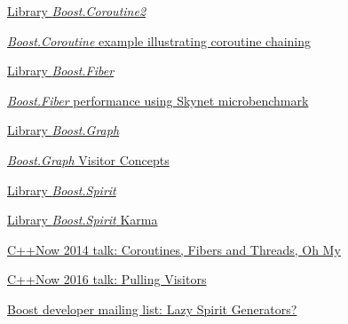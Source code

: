\begin{thebibliography}{99}
        \href{http://www.boost.org/doc/libs/release/libs/coroutine2/doc/html/index.html}
        {Library \emph{Boost.Coroutine2}}

        \href{https://github.com/boostorg/coroutine/blob/master/example/asymmetric/chaining.cpp}
        {\emph{Boost.Coroutine} example illustrating coroutine chaining}

        \href{http://www.boost.org/doc/libs/release/libs/fiber/doc/html/index.html}
        {Library \emph{Boost.Fiber}}

        \href{http://www.boost.org/doc/libs/release/libs/fiber/doc/html/fiber/performance.html}
        {\emph{Boost.Fiber} performance using Skynet microbenchmark}

        \href{http://www.boost.org/doc/libs/release/libs/graph/doc/index.html}
        {Library \emph{Boost.Graph}}

        \href{http://www.boost.org/doc/libs/release/libs/graph/doc/visitor_concepts.html}
        {\emph{Boost.Graph} Visitor Concepts}

        \href{http://www.boost.org/doc/libs/release/libs/spirit/doc/html/index.html}
        {Library \emph{Boost.Spirit}}

        \href{http://www.boost.org/doc/libs/release/libs/spirit/doc/html/spirit/karma.html}
        {Library \emph{Boost.Spirit} Karma}

        \href{https://www.youtube.com/watch?v=S6JpbmeuzNg}
        {C++Now 2014 talk: Coroutines, Fibers and Threads, Oh My}

        \href{https://www.youtube.com/watch?v=3SvkWY7JSeY}
        {C++Now 2016 talk: Pulling Visitors}

        \href{http://boost.2283326.n4.nabble.com/Lazy-Spirit-Generators-td4691618.html}
        {Boost developer mailing list: Lazy Spirit Generators?}

\end{thebibliography}
